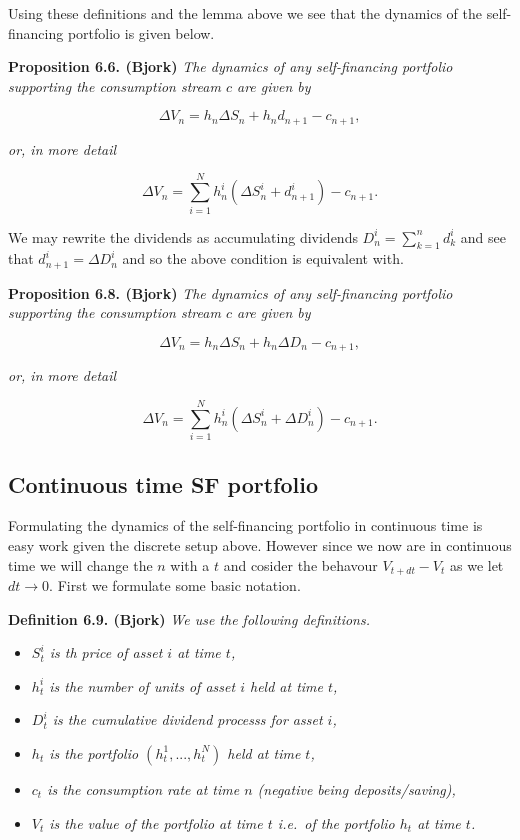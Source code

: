 \documentclass[a4paper,12pt,openany]{book}
\providecommand{\tightlist}{%
 \setlength{\itemsep}{0pt}\setlength{\parskip}{0pt}}
\begin{document}
Using these definitions and the lemma above we see that the dynamics of the self-financing portfolio is given below.

\textbf{Proposition 6.6. (Bjork)} \emph{The dynamics of any self-financing portfolio supporting the consumption stream \(c\) are given by}

\[
\Delta V_n=h_n \Delta S_n+h_nd_{n+1}-c_{n+1},\tag{6.11}
\]

\emph{or, in more detail}

\[
\Delta V_n=\sum_{i=1}^Nh_n^i(\Delta S_n^i+d^i_{n+1})-c_{n+1}.\tag{6.12}
\]

We may rewrite the dividends as accumulating dividends \(D^i_n=\sum_{k=1}^nd^i_k\) and see that \(d_{n+1}^i=\Delta D^i_n\) and so the above condition is equivalent with.

\textbf{Proposition 6.8. (Bjork)} \emph{The dynamics of any self-financing portfolio supporting the consumption stream \(c\) are given by}

\[
\Delta V_n=h_n \Delta S_n+h_n\Delta D_n-c_{n+1},\tag{6.15}
\]

\emph{or, in more detail}

\[
\Delta V_n=\sum_{i=1}^Nh_n^i(\Delta S_n^i+\Delta D^i_n)-c_{n+1}.\tag{6.16}
\]

\hypertarget{continuous-time-sf-portfolio}{%
\subsection{Continuous time SF portfolio}\label{continuous-time-sf-portfolio}}

Formulating the dynamics of the self-financing portfolio in continuous time is easy work given the discrete setup above. However since we now are in continuous time we will change the \(n\) with a \(t\) and cosider the behavour \(V_{t+dt}-V_t\) as we let \(dt\to 0\). First we formulate some basic notation.

\textbf{Definition 6.9. (Bjork)} \emph{We use the following definitions.}

\begin{itemize}
\tightlist
\item
  \emph{\(S_t^i\) is th price of asset \(i\) at time \(t\),}
\item
  \emph{\(h_t^i\) is the number of units of asset \(i\) held at time \(t\),}
\item
  \emph{\(D_t^i\) is the cumulative dividend processs for asset \(i\),}
\item
  \emph{\(h_t\) is the portfolio \((h_t^1,...,h_t^N)\) held at time \(t\),}
\item
  \emph{\(c_t\) is the consumption rate at time \(n\) (negative being deposits/saving),}
\item
  \emph{\(V_t\) is the value of the portfolio at time \(t\) i.e.~of the portfolio \(h_t\) at time \(t\).}
\end{itemize}
\end{document}
